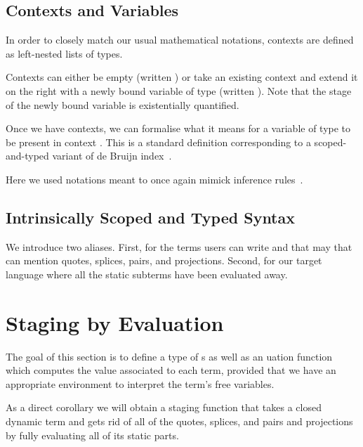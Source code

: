 \documentclass{article}
\begin{document}
\subsection{Contexts and Variables}

In order to closely match our usual mathematical notations,
contexts are defined as left-nested lists of types.


Contexts can either be empty (written )
or take an existing context  and extend it on the
right with a newly bound variable of type 
(written  \AIC{,} ).
Note that the stage of the newly bound variable is
existentially quantified.

Once we have contexts, we can formalise what it means
for a variable of type  to be present in context .
This is a standard definition corresponding to a scoped-and-typed
variant of de Bruijn index~\cite{de1972lambda}.


Here we used notations meant to once again mimick inference
rules~\cite{DBLP:conf/cpp/Allais0MM17}.

\subsection{Intrinsically Scoped and Typed Syntax}


We introduce two aliases.
%
First,  for the terms users can write and that
may that can mention quotes, splices, pairs, and projections.
%
Second,  for our target language where all the
static subterms have been evaluated away.


\section{Staging by Evaluation}

The goal of this section is to define a type of s
as well as an uation function which computes the
value associated to each term, provided that we have an
appropriate environment to interpret the term's free variables.


As a direct corollary we will obtain a staging function
that takes a closed dynamic term and gets rid of all of
the quotes, splices, and pairs and projections by fully
evaluating all of its static parts.
\end{document}

